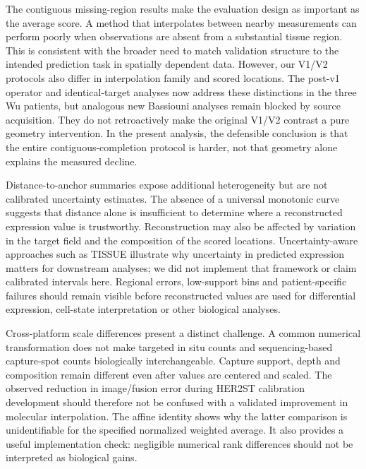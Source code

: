 The contiguous missing-region results make the evaluation design as important as the average score. A method that interpolates between nearby measurements can perform poorly when observations are absent from a substantial tissue region. This is consistent with the broader need to match validation structure to the intended prediction task in spatially dependent data\cite{roberts2017}. However, our V1/V2 protocols also differ in interpolation family and scored locations. The post-v1 operator and identical-target analyses now address these distinctions in the three Wu patients, but analogous new Bassiouni analyses remain blocked by source acquisition. They do not retroactively make the original V1/V2 contrast a pure geometry intervention. In the present analysis, the defensible conclusion is that the entire contiguous-completion protocol is harder, not that geometry alone explains the measured decline.

Distance-to-anchor summaries expose additional heterogeneity but are not calibrated uncertainty estimates. The absence of a universal monotonic curve suggests that distance alone is insufficient to determine where a reconstructed expression value is trustworthy. Reconstruction may also be affected by variation in the target field and the composition of the scored locations. Uncertainty-aware approaches such as TISSUE illustrate why uncertainty in predicted expression matters for downstream analyses\cite{sun2024}; we did not implement that framework or claim calibrated intervals here. Regional errors, low-support bins and patient-specific failures should remain visible before reconstructed values are used for differential expression, cell-state interpretation or other biological analyses.

Cross-platform scale differences present a distinct challenge. A common numerical transformation does not make targeted in situ counts and sequencing-based capture-spot counts biologically interchangeable. Capture support, depth and composition remain different even after values are centered and scaled. The observed reduction in image/fusion error during HER2ST calibration development should therefore not be confused with a validated improvement in molecular interpolation. The affine identity shows why the latter comparison is unidentifiable for the specified normalized weighted average. It also provides a useful implementation check: negligible numerical rank differences should not be interpreted as biological gains.


